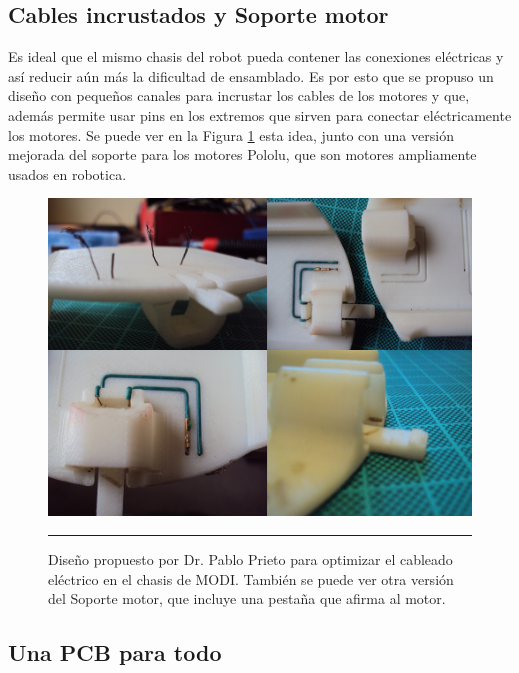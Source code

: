 \subsection{Cables incrustados y Soporte motor}
Es ideal que el mismo chasis del robot pueda contener las conexiones eléctricas y así reducir aún más la dificultad de ensamblado. Es por esto que se propuso un diseño con pequeños canales para incrustar los cables de los motores y que, además permite usar pins en los extremos que sirven para conectar eléctricamente los motores. Se puede ver en la Figura \ref{fig:Cables incrustados} esta idea, junto con una versión mejorada del soporte para los motores Pololu, que son motores ampliamente usados en robotica.

\begin{figure}[htbp]
	\centering
		\includegraphics[width=\textwidth]{./Pictures/wires.png}
		\rule{35em}{0.5pt}
	\caption[Cables incrustados y Soporte motor]{Diseño propuesto por Dr. Pablo Prieto para optimizar el cableado eléctrico en el chasis de MODI. También se puede ver otra versión del Soporte motor, que incluye una pestaña que afirma al motor.}
	\label{fig:Cables incrustados}
\end{figure}	







\subsection{Una PCB para todo}

